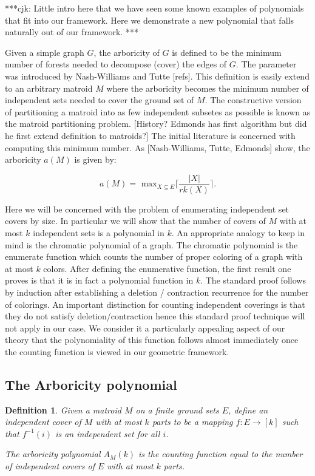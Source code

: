 \documentclass[12pt]{amsart}
\newtheorem{definition}{Definition}
\begin{document}
***cjk: Little intro here that we have seen some known examples of
polynomials that fit into our framework.  Here we demonstrate a new polynomial 
that falls naturally out of our framework. ***


Given a simple graph $G$, the arboricity of $G$ is defined to be the
minimum number of forests needed to decompose (cover) the edges of
$G$.  The parameter was introduced by Nash-Williams and Tutte [refs].
This definition is easily extend to an arbitrary matroid $M$ where the
arboricity becomes the minimum number of independent sets needed to
cover the ground set of $M$.  The constructive version of partitioning
a matroid into as few independent subsetes as possible is known as the
matroid partitioning problem. [History?  Edmonds has first algorithm
  but did he first extend definition to matroids?]  The initial
literature is concerned with computing this minimum number.  As
[Nash-Williams, Tutte, Edmonds] show, the arboricity $a(M)$ is given
by:

$$ a(M) = \textrm{ max}_{X\subseteq E} \lceil { \frac{|X|}{rk(X)}} \rceil . $$

Here we will be concerned with the problem of enumerating independent
set covers by size.  In particular we will show that the number of
covers of $M$ with at most $k$ independent sets is a polynomial in
$k$.  An appropriate analogy to keep in mind is the chromatic
polynomial of a graph.  The chromatic polynomial is the enumerate
function which counts the number of proper coloring of a graph with at
most $k$ colors.  After defining the enumerative function, the first
result one proves is that it is in fact a polynomial function in $k$.
The standard proof follows by induction after establishing a deletion
/ contraction recurrence for the number of colorings.  An important
distinction for counting independent coverings is that they do not
satisfy deletion/contraction hence this standard proof technique will
not apply in our case.  We consider it a particularly appealing aspect
of our theory that the polynomiality of this function follows almost
immediately once the counting function is viewed in our geometric
framework.

\subsection{The Arboricity polynomial}

\begin{definition} Given a matroid $M$ on a finite ground sets $E$, define an independent cover of $M$ with at most $k$ parts to be a mapping $f : E \rightarrow [k]$ such that $f^{-1}(i)$ is an independent set for all $i$.  

  The arboricity polynomial $A_M(k)$ is the counting function equal to the number of independent covers of $E$ with at most $k$ parts.
\end{definition}
\end{document}
